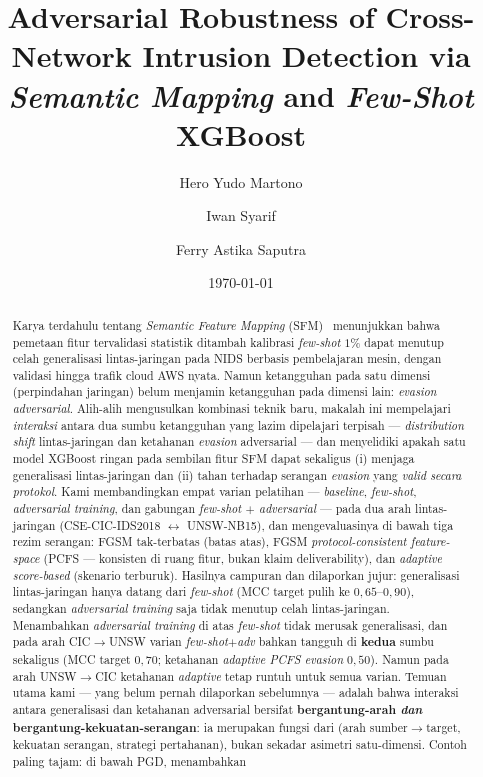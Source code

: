 \documentclass[11pt,a4paper]{article}
\title{Adversarial Robustness of Cross-Network Intrusion Detection via
\emph{Semantic Mapping} and \emph{Few-Shot} XGBoost}
\author{Hero Yudo Martono \and Iwan Syarif \and Ferry Astika Saputra}
\date{\today}
\begin{document}
\maketitle
  
\begin{abstract}
Karya terdahulu tentang \emph{Semantic Feature Mapping} (SFM)~\cite{martono2024sfm}
menunjukkan bahwa pemetaan fitur tervalidasi statistik ditambah kalibrasi
\emph{few-shot} $1\%$ dapat menutup celah generalisasi lintas-jaringan pada NIDS
berbasis pembelajaran mesin, dengan validasi hingga trafik cloud AWS nyata. Namun ketangguhan pada satu dimensi (perpindahan
jaringan) belum menjamin ketangguhan pada dimensi lain: \emph{evasion adversarial}.
Alih-alih mengusulkan kombinasi teknik baru, makalah ini mempelajari
\emph{interaksi} antara dua sumbu ketangguhan yang lazim dipelajari terpisah ---
\emph{distribution shift} lintas-jaringan dan ketahanan \emph{evasion} adversarial
--- dan menyelidiki apakah satu model XGBoost ringan pada sembilan fitur SFM dapat
sekaligus (i) menjaga generalisasi lintas-jaringan dan (ii) tahan terhadap serangan
\emph{evasion} yang \emph{valid secara protokol}. Kami membandingkan empat
varian pelatihan --- \emph{baseline}, \emph{few-shot}, \emph{adversarial training},
dan gabungan \emph{few-shot $+$ adversarial} --- pada dua arah lintas-jaringan
(CSE-CIC-IDS2018 $\leftrightarrow$ UNSW-NB15), dan mengevaluasinya di bawah tiga
rezim serangan: FGSM tak-terbatas (batas atas), FGSM \emph{protocol-consistent
feature-space} (PCFS --- konsisten di ruang fitur, bukan klaim deliverability), dan
\emph{adaptive score-based} (skenario terburuk). Hasilnya campuran
dan dilaporkan jujur: generalisasi lintas-jaringan hanya datang dari \emph{few-shot}
(MCC target pulih ke $0{,}65$--$0{,}90$), sedangkan \emph{adversarial training} saja
tidak menutup celah lintas-jaringan. Menambahkan \emph{adversarial training} di atas
\emph{few-shot} tidak merusak generalisasi, dan pada arah CIC$\rightarrow$UNSW
varian \emph{few-shot$+$adv} bahkan tangguh di \textbf{kedua} sumbu sekaligus (MCC
target $0{,}70$; ketahanan \emph{adaptive PCFS evasion} $0{,}50$). Namun pada
arah UNSW$\rightarrow$CIC ketahanan \emph{adaptive} tetap runtuh untuk semua varian.
Temuan utama kami --- yang belum pernah dilaporkan sebelumnya --- adalah bahwa
interaksi antara generalisasi dan ketahanan adversarial bersifat
\textbf{bergantung-arah \emph{dan} bergantung-kekuatan-serangan}: ia merupakan fungsi
dari (arah sumber$\rightarrow$target, kekuatan serangan, strategi pertahanan), bukan
sekadar asimetri satu-dimensi. Contoh paling tajam: di bawah PGD, menambahkan

\end{abstract}
\end{document}
